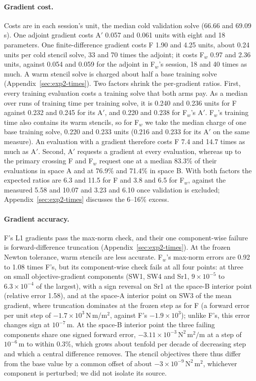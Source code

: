 \paragraph{Gradient cost.}
Costs are in each session's unit, the median cold validation solve (66.66
and 69.09\,s). One adjoint gradient costs A$'$ 0.057 and 0.061 units with
eight and 18 parameters. One finite-difference gradient costs F 1.90 and
4.25 units, about 0.24 units per cold stencil solve, 33 and 70 times the
adjoint; it costs F$_w$ 0.97 and 2.36 units, against 0.054 and 0.059 for
the adjoint in F$_w$'s session, 18 and 40 times as much. A warm
stencil solve is charged about half a base training solve
(Appendix~\ref{sec:exp2-times}). Two factors shrink the per-gradient ratios. First, every training
evaluation costs a training solve that both arms pay. As a median over runs
of training time per training solve, it is 0.240 and 0.236 units for F
against 0.232 and 0.245 for its A$'$, and 0.220 and 0.238 for F$_w$'s A$'$.
F$_w$'s training time also contains its warm stencils, so for F$_w$ we take
the median charge of one base training solve, 0.220 and 0.233 units (0.216
and 0.233 for its A$'$ on the same measure). An evaluation with a gradient
therefore costs F 7.4 and 14.7 times as much as A$'$. Second, A$'$
requests a gradient at every evaluation, whereas up to the primary
crossing F and F$_w$ request one at a median 83.3\% of their evaluations
in space A and at 76.9\% and 71.4\% in space B. With both factors the expected
ratios are 6.3 and 11.5 for F and 3.8 and 6.5 for F$_w$, against the
measured 5.58 and 10.07 and 3.23 and 6.10 once validation is excluded;
Appendix~\ref{sec:exp2-times} discusses the 6--16\% excess.

\paragraph{Gradient accuracy.}
F's L1 gradients pass the max-norm check, and their one component-wise
failure is forward-difference truncation (Appendix~\ref{sec:exp2-times}).
At the frozen Newton tolerance, warm stencils
are less accurate. F$_w$'s max-norm errors are 0.92 to 1.08 times F's, but
its component-wise check fails at all four points: at three on small
objective-gradient components (SW1, SW4 and Sr1, $9\times10^{-5}$ to
$6.3\times10^{-4}$ of the largest), with a sign reversal on Sr1 at the
space-B interior point (relative error 1.58), and at the space-A interior
point on SW3 of the mean gradient, where truncation dominates at the frozen
step as for F (a forward error per unit step of
$-1.7\times10^{3}$\,N\,m/m$^2$, against F's $-1.9\times10^{3}$); unlike
F's, this error changes sign at $10^{-7}$\,m. At the
space-B interior point the three failing components share one signed
forward error, $-3.11\times10^{-3}\,\mathrm{N^2\,m^2/m}$ at a step of
$10^{-6}$\,m to within 0.3\%, which grows about tenfold per decade of decreasing step and which a
central difference removes. The stencil objectives there thus differ from
the base value by a common offset of about
$-3\times10^{-9}\,\mathrm{N^2\,m^2}$, whichever component is perturbed; we
did not isolate its source.

